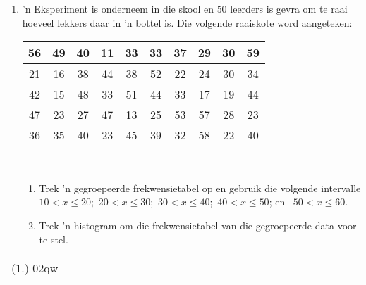 \begin{exercises}{}{
    \begin{enumerate}[itemsep=5pt, label=\textbf{\arabic*}. ]
    \item ’n Eksperiment is onderneem in die skool en $50$ leerders is gevra om te raai hoeveel lekkers daar in ’n bottel is. Die volgende raaiskote word aangeteken:
      \\
      \begin{center}
        \begin{tabular}{|c|c|c|c|c|c|c|c|c|c|} \hline
          56 & 49 & 40 & 11 & 33 & 33 & 37 & 29 & 30 & 59 \\ \hline
          21 & 16 & 38 & 44 & 38 & 52 & 22 & 24 & 30 & 34 \\\hline
          42 & 15 & 48 & 33 & 51 & 44 & 33 & 17 & 19 & 44 \\\hline
          47 & 23 & 27 & 47 & 13 & 25 & 53 & 57 & 28 & 23 \\\hline
          36 & 35 & 40 & 23 & 45 & 39 & 32 & 58 & 22 & 40 \\\hline
        \end{tabular}
      \end{center}
      \vspace{8pt}\\

      \begin{enumerate}[noitemsep, label=\textbf{(\alph*)} ]
      \item Trek ’n gegroepeerde frekwensietabel op en gebruik die volgende intervalle
        $10 < x \leq 20$;\ $20 < x \leq 30$;\ $30 < x \leq 40$;\ 
        $40 < x \leq 50$; en \ $50 < x \leq 60$.
      \item Trek ’n histogram om die frekwensietabel van die gegroepeerde data voor te stel.
      \end{enumerate}
    \end{enumerate}
\par \practiceinfo
\par \begin{tabular}[h]{cccccc}
(1.)	02qw	&
\end{tabular}
}
\end{exercises}
% 
